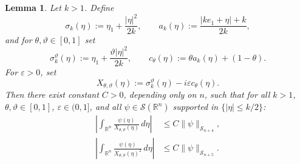 \documentclass[10pt,a4paper]{amsart}
\newtheorem{lemma}{Lemma}
\begin{document}
\begin{lemma}\label{lem:aux_sing}
Let $k> 1$.  Define
\begin{equation*}
    \sigma_k(\eta):=\eta_1+\frac{|\eta|^2}{2k},
  \qquad
  a_k(\eta):=\frac{|ke_1+\eta|+k}{2k},
\end{equation*}
and for $\theta,\vartheta\in[0,1]$ set
\begin{equation}\label{eq:aux_interp}
  \sigma_k^\vartheta(\eta):=\eta_1+\frac{\vartheta|\eta|^2}{2k},
  \qquad
  c_\theta(\eta):=\theta a_k(\eta)+(1-\theta).
\end{equation}
For $\varepsilon>0$, set
\begin{equation}\label{eq:aux_X}
  X_{\theta,\vartheta}(\eta)
  :=\sigma_k^\vartheta(\eta)-i\varepsilon c_\theta(\eta).
\end{equation}
Then there exist constant $C>0$, depending only on $n$, such that for all $k>1$,
$\theta,\vartheta\in[0,1]$, $\varepsilon\in(0,1]$,
and all $\psi\in\mathscr{S}(\mathbb{R}^n)$ supported in $\{|\eta|\leq k/2\}$:
\begin{align}
  \left|\int_{\mathbb{R}^n}\frac{\psi(\eta)}{X_{\theta,\vartheta}(\eta)}\,d\eta\right|
  &\leq C\|\psi\|_{\mathscr{S}_{n+4}},
  \label{eq:aux_inv1}\\
  \left|\int_{\mathbb{R}^n}\frac{\psi(\eta)}{X_{\theta,\vartheta}(\eta)^2}\,d\eta\right|
  &\leq C\|\psi\|_{\mathscr{S}_{n+5}}.
  \label{eq:aux_inv2}
\end{align}
\end{lemma}
\end{document}
